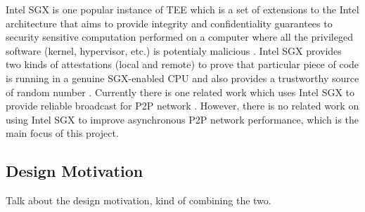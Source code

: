 Intel SGX is one popular instance of TEE which is a set of extensions to the Intel architecture that aims to provide integrity and confidentiality guarantees to security sensitive computation performed on a computer where all the privileged software (kernel, hypervisor, etc.) is potentialy malicious \cite{costan2016intel}. Intel SGX provides two kinds of attestations (local and remote) to prove that particular piece of code is running in a genuine SGX-enabled CPU \cite{2018arXiv180802252C} and also provides a trustworthy source of random number \cite{intelsgx}. Currently there is one related work which uses Intel SGX to provide reliable broadcast for P2P network \cite{jia2017robust}. However, there is no related work on using Intel SGX to improve asynchronous P2P network performance, which is the main focus of this project.


\subsection{Design Motivation}

Talk about the design motivation, kind of combining the two.